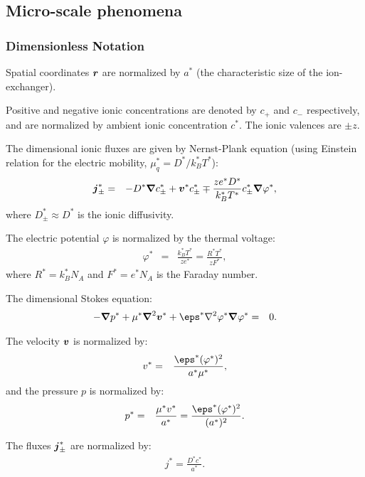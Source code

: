 \subsection{Micro-scale phenomena}

\subsubsection{Dimensionless Notation}

Spatial coordinates $\boldsymbol{r}$ are normalized by $a^*$ (the characteristic size of the ion-exchanger).

Positive and negative ionic concentrations are denoted by $c_+$ and $c_-$ respectively, and
are normalized by ambient ionic concentration $c^*$. The ionic valences are $\pm z$.

The dimensional ionic fluxes are given by Nernst-Plank equation 
(using Einstein relation for the electric mobility, $\mu_q^* = D^* / k_B^* T^*$):
\begin{eqnarray}
\boldsymbol{j}^*_\pm &=& 
-D^* \boldsymbol{\nabla} c^*_\pm + \boldsymbol{v}^* c^*_\pm \mp \frac{z e^* D^*}{k_B^* T^*} c^*_\pm \boldsymbol{\nabla} \varphi^*,
\end{eqnarray}
where $D^*_\pm \approx D^*$ is the ionic diffusivity.

The electric potential $\varphi$ is normalized by the thermal voltage:
\begin{eqnarray}
\varphi^* &=& \frac{k_B^* T^*}{z e^*} = \frac{R^* T^*}{z F^*},
\end{eqnarray}
where $R^* = k_B^* N_A$ and $F^* = e^* N_A$ is the Faraday number.

The dimensional Stokes equation:
\begin{eqnarray}
-\bnabla p^* + \mu^* \bLaplacian \bv^* + \eps^* \Laplacian \varphi^* \bnabla \varphi^* &=& 0.
\end{eqnarray}

The velocity $\boldsymbol{v}$ is normalized by:
\begin{eqnarray}
v^* &=& \frac{\eps^* (\varphi^*)^2}{a^* \mu^*},
\end{eqnarray}
and the pressure $p$ is normalized by:
\begin{eqnarray}
p^* &=& \frac{\mu^* v^*}{a^*} = \frac{\eps^* (\varphi^*)^2}{(a^*)^2}.
\end{eqnarray}

The fluxes $\boldsymbol{j}^*_\pm$ are normalized by:
\begin{eqnarray}
j^* = \frac{D^* c^*}{a^*}.
\end{eqnarray}

